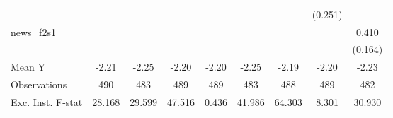 {\begin{tabular}{l*{8}{c}}
            &                     &                     &                     &                     &                     &                     &     (0.251)         &                     \\
\addlinespace
news\_f2s1   &                     &                     &                     &                     &                     &                     &                     &       0.410\sym{**} \\
            &                     &                     &                     &                     &                     &                     &                     &     (0.164)         \\
\midrule
Mean Y      &       -2.21         &       -2.25         &       -2.20         &       -2.20         &       -2.25         &       -2.19         &       -2.20         &       -2.23         \\
Observations&         490         &         483         &         489         &         489         &         483         &         488         &         489         &         482         \\
Exc. Inst. F-stat&      28.168         &      29.599         &      47.516         &       0.436         &      41.986         &      64.303         &       8.301         &      30.930         \\
\bottomrule
\end{tabular}
}
